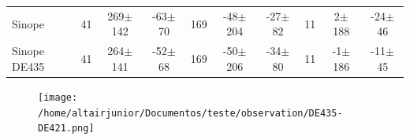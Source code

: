 \documentclass[11pt,a4paper]{report}
\begin{document}
\begin{landscape}
\begin{table}
\begin{centering}
\begin{tabular}{l|ccc|ccc|ccc}
\hdashline
Sinope  & 41 & 269$\pm$142 & -63$\pm$ 70 & 169 & -48$\pm$204 & -27$\pm$ 82 & 11 &   2$\pm$188 & -24$\pm$ 46\tabularnewline
Sinope DE435 & 41 & 264$\pm$141 & -52$\pm$ 68 & 169 & -50$\pm$206 & -34$\pm$ 80 & 11 &  -1$\pm$186 & -11$\pm$ 45 \tabularnewline
\hline
\end{tabular}
\par \end{centering}
\end{table}


\begin{figure}
\texttt{[image: /home/altairjunior/Documentos/teste/observation/DE435-DE421.png]}
\end{figure}


\begin{figure}
\begin{centering}
\end{centering}
\end{figure}


\end{landscape}
\end{document}
